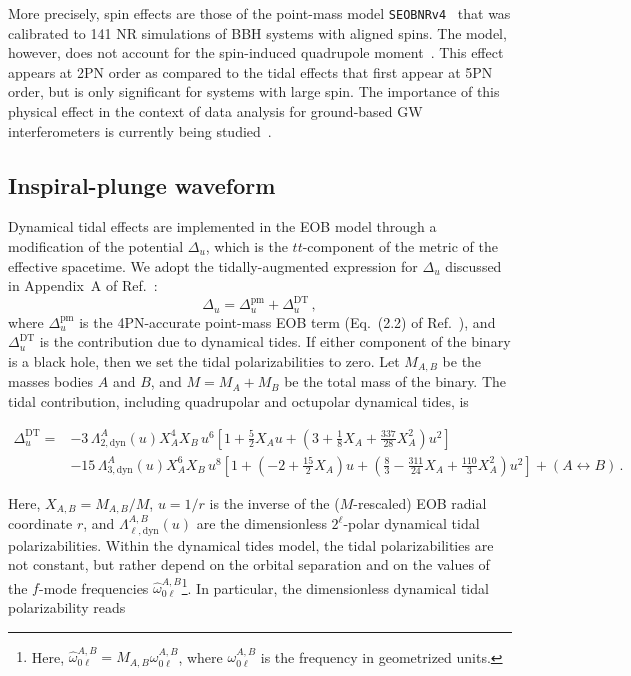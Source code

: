 \documentclass[prd,aps,letter,twocolumn,floatfix,notitlepage,nofootinbib]{revtex4-1}
\begin{document}
More precisely, spin effects are those of the point-mass model \texttt{SEOBNRv4}~\cite{Bohe:2016gbl} that was calibrated to 141 NR simulations of BBH systems with aligned spins. The model, however, does not account for the spin-induced quadrupole moment~\cite{Poisson1998}. This effect appears at 2PN order as compared to the tidal effects that first appear at 5PN order, but is only significant for systems with large spin. The importance of this physical effect in the context of data analysis for ground-based GW interferometers is currently being studied~\cite{HarryHinderer2017}.

\subsection{Inspiral-plunge waveform}

Dynamical tidal effects are implemented in the EOB model through a modification of the potential $\Delta_u$, which is the $tt$-component of the metric of the effective spacetime. We adopt the tidally-augmented expression for $\Delta_u$ discussed in Appendix~A of Ref.~\cite{Steinhoff:2016rfi}:
\begin{equation}
\Delta_u = \Delta_u^{\textrm{pm}} + \Delta_u^{\textrm{DT}}\,,
\end{equation}
where $\Delta_u^{\textrm{pm}}$ is the 4PN-accurate point-mass EOB term (Eq.~(2.2) of Ref.~\cite{Bohe:2016gbl}), and $\Delta_u^{\textrm{DT}}$ is the contribution due to dynamical tides. If either component of the binary is a black hole, then we set the tidal polarizabilities to zero. Let $M_{A,B}$ be the masses bodies $A$ and $B$, and $M = M_A + M_B$ be the total mass of the binary. The tidal contribution, including quadrupolar and octupolar dynamical tides, is
\begin{widetext}
\begin{align}
 \Delta_u^{\textrm{DT}} =&  - 3\,\Lambda_{2,\textrm{dyn}}^{A}(u)X_A^4 X_B\,u^6  \left[ 1 + \frac{5}{2} X_Au + \left(3 + \frac{1}{8}X_A + \frac{337}{28} X_A^2\right)u^2 \right]\nonumber\\
 &- 15\,\Lambda_{3,\textrm{dyn}}^{A}(u)X_A^6X_B\,u^8 \left[1 + \left(-2 + \frac{15}{2}X_A\right)u + \left(\frac{8}{3} - \frac{311}{24}X_A + \frac{110}{3}X_A^2\right) u^2\right] + (A \leftrightarrow B)\,.
\end{align}
\end{widetext}
Here, $X_{A,B}=M_{A,B}/M$, $u=1/r$ is the inverse of the ($M$-rescaled) EOB radial coordinate $r$, and $\Lambda_{\ell,\textrm{dyn}}^{A,B}(u)$ are the dimensionless $2^{\ell}$-polar dynamical tidal polarizabilities. Within the dynamical tides model, the tidal polarizabilities are not constant, but rather depend on the orbital separation and on the values of the $f$-mode frequencies $\hat{\omega}_{0\ell}^{A,B}$\footnote{Here, $\hat{\omega}_{0\ell}^{A,B}=M_{A,B}\omega_{0\ell}^{A,B}$, where $\omega_{0\ell}^{A,B}$ is the frequency in geometrized units.}. In particular, the dimensionless dynamical tidal polarizability reads
\end{document}
